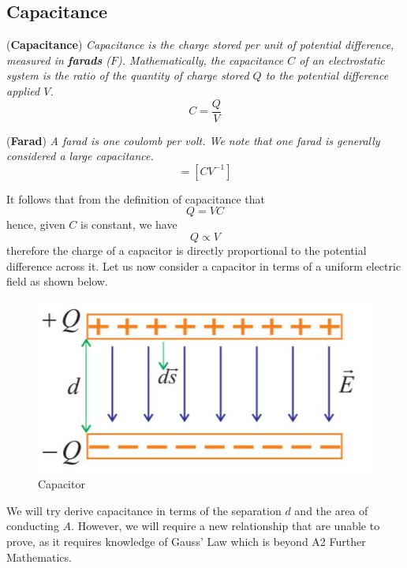 \subsection{Capacitance}
\begin{definition}{(\textbf{Capacitance})}
\textit{Capacitance is the charge stored per unit of potential difference, measured in \textbf{farads} ($F$). Mathematically, the capacitance $C$ of an electrostatic system is the ratio of the quantity of charge stored $Q$ to the potential difference applied $V$. }
\begin{equation}
    C = \frac{Q}{V}
\end{equation}
\end{definition}
\begin{definition}{(\textbf{Farad})}
\textit{A farad is one coulomb per volt. We note that one farad is generally considered a large capacitance.}
\begin{equation*}
    [F] = [CV^{-1}]
\end{equation*}
\end{definition}
\noindent It follows that from the definition of capacitance that
\begin{equation}
    Q = VC
\end{equation}
hence, given $C$ is constant, we have
\begin{equation}
    Q \propto V
\end{equation}
therefore the charge of a capacitor is directly proportional to the potential difference across it. Let us now consider a capacitor in terms of a uniform electric field as shown below.
\begin{figure}[h!]
    \centering
    \includegraphics[scale=0.75]{notes/images/Capacitor-Electric-Field.JPG}
    \caption{Capacitor}
\end{figure}
\FloatBarrier
We will try derive capacitance in terms of the separation $d$ and the area of conducting $A$. However, we will require a new relationship that are unable to prove, as it requires knowledge of Gauss' Law which is beyond A2 Further Mathematics. 
